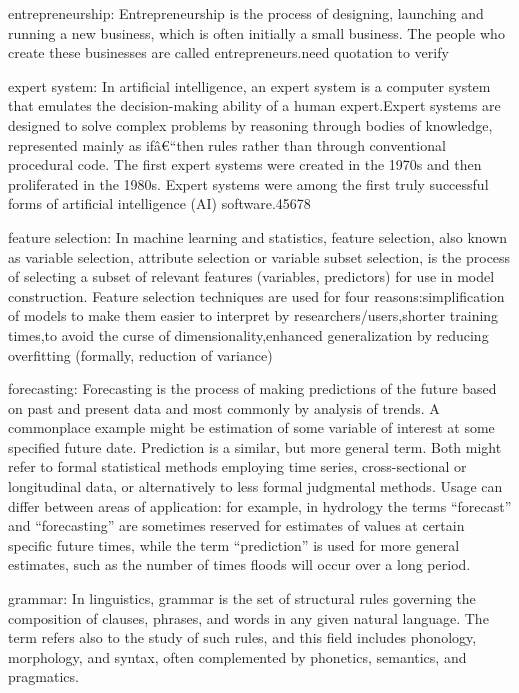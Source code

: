 \documentclass[]{book}
\newcommand{\euro}{€}
\begin{document}
entrepreneurship: Entrepreneurship is the process of designing,
launching and running a new business, which is often initially a small
business. The people who create these businesses are called
entrepreneurs.need quotation to verify

expert system: In artificial intelligence, an expert system is a
computer system that emulates the decision-making ability of a human
expert.Expert systems are designed to solve complex problems by
reasoning through bodies of knowledge, represented mainly as
ifâ\euro{}``then rules rather than through conventional procedural code.
The first expert systems were created in the 1970s and then proliferated
in the 1980s. Expert systems were among the first truly successful forms
of artificial intelligence (AI) software.45678

feature selection: In machine learning and statistics, feature
selection, also known as variable selection, attribute selection or
variable subset selection, is the process of selecting a subset of
relevant features (variables, predictors) for use in model construction.
Feature selection techniques are used for four reasons:simplification of
models to make them easier to interpret by researchers/users,shorter
training times,to avoid the curse of dimensionality,enhanced
generalization by reducing overfitting (formally, reduction of variance)

forecasting: Forecasting is the process of making predictions of the
future based on past and present data and most commonly by analysis of
trends. A commonplace example might be estimation of some variable of
interest at some specified future date. Prediction is a similar, but
more general term. Both might refer to formal statistical methods
employing time series, cross-sectional or longitudinal data, or
alternatively to less formal judgmental methods. Usage can differ
between areas of application: for example, in hydrology the terms
``forecast'' and ``forecasting'' are sometimes reserved for estimates of
values at certain specific future times, while the term ``prediction''
is used for more general estimates, such as the number of times floods
will occur over a long period.

grammar: In linguistics, grammar is the set of structural rules
governing the composition of clauses, phrases, and words in any given
natural language. The term refers also to the study of such rules, and
this field includes phonology, morphology, and syntax, often
complemented by phonetics, semantics, and pragmatics.
\end{document}
